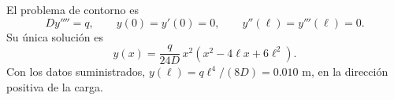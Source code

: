 El problema de contorno es
\[
Dy''''=q,\qquad y(0)=y'(0)=0,\qquad
 y''(\ell)=y'''(\ell)=0.
\]
Su única solución es
\[
y(x)=\frac{q}{24D}\,x^2(x^2-4\ell x+6\ell^2).
\]
Con los datos suministrados, \(y(\ell)=q\ell^4/(8D)=0.010\) m, en la dirección positiva de la carga.
